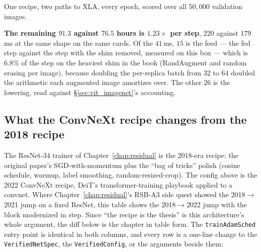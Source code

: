 \begin{center}
\end{center}

\noindent One recipe, two paths to XLA, every epoch, scored over all
$50{,}000$ validation images.

\medskip\noindent\textbf{The remaining $91.3$ against $76.5$ hours is
$1.23\times$ per step}, $220$ against $179$\,ms at the same shape on the
same cards. Of the $41$\,ms, $15$ is the feed --- the fed step against the
step with the shim removed, measured on this box --- which is $6.8\%$ of
the step on the heaviest shim in the book (RandAugment and random
erasing per image), because doubling the per-replica batch from
$32$ to $64$ doubled the arithmetic each augmented image amortizes over.
The other $26$ is the lowering, read against
\S\ref{sec:vit_imagenet}'s accounting.

\subsection*{What the ConvNeXt recipe changes from the 2018 recipe}

The ResNet-34 trainer of Chapter~\ref{chap:residual} is the
2018-era recipe: the original paper's SGD-with-momentum plus
the ``bag of tricks'' polish (cosine schedule, warmup, label
smoothing, random-resized-crop). The config above is the 2022
ConvNeXt recipe, DeiT's transformer-training playbook applied to a
convnet. Where Chapter~\ref{chap:residual}'s RSB-A3 side quest showed
the 2018$\to$2021 jump on a fixed ResNet, this table shows the
2018$\to$2022 jump with the block modernized in step. Since
``the recipe is the thesis'' is this architecture's whole argument,
the diff below is the chapter in table form. The
\texttt{trainAdamSched} entry point is identical in both columns, and
every row is a one-line change to the \texttt{VerifiedNetSpec}, the
\texttt{VerifiedConfig}, or the arguments beside them:

